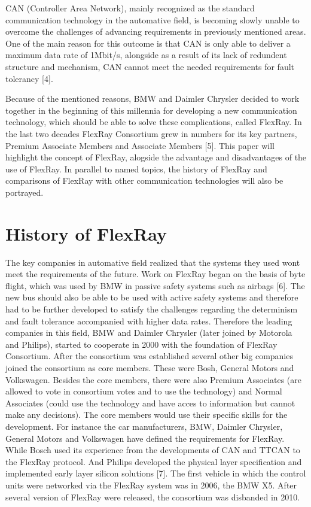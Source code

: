 \documentclass[conference]{IEEEtran}
\begin{document}
CAN (Controller Area Network), mainly recognized as the standard communication technology in the automative field, is becoming slowly unable to overcome the challenges of advancing requirements in previously mentioned areas. One of the main reason for this outcome is that CAN is only able to deliver a maximum data rate of 1Mbit/s, alongside as a result of its lack of redundent structure and mechanism, CAN cannot meet the needed requirements for fault tolerancy [4].

Because of the mentioned reasons, BMW and Daimler Chrysler decided to work together in the beginning of this millennia for developing a new communication technology, which should be able to solve these complications, called FlexRay. In the last two decades FlexRay Consortium grew in numbers for its key partners, Premium Associate Members and Associate Members [5]. This paper will highlight the concept of FlexRay, alogside the advantage and disadvantages of the use of FlexRay. In parallel to named topics, the history of FlexRay and comparisons of FlexRay with other communication technologies will also be portrayed.


\section{History of FlexRay}
The key companies in automative field realized that the systems they used wont meet the requirements of the future. Work on FlexRay began on the basis of byte flight, which was used by BMW in passive safety systems such as airbags [6]. The new bus should also be able to be used with active safety systems and therefore had to be further developed to satisfy the challenges regarding the determinism and fault tolerance accompanied with higher data rates. Therefore the leading companies in this field, BMW and Daimler Chrysler (later joined by Motorola and Philips), started to cooperate in 2000 with the foundation of FlexRay Consortium. After the consortium was established several other big companies joined the consortium as core members. These were Bosh, General Motors and Volkswagen. Besides the core members, there were also Premium Associates (are allowed to vote in consortium votes and to use the technology) and Normal Associates (could use the technology and have acces to information but cannot make any decisions). The core members would use their specific skills for the development. For instance the car manufacturers, BMW, Daimler Chrysler, General Motors and Volkswagen have defined the requirements for FlexRay. While Bosch used its experience from the developments of CAN and TTCAN to the FlexRay protocol. And Philips developed the physical layer specification and implemented early layer silicon solutions [7]. The first vehicle in which the control units were networked via the FlexRay system was in 2006, the BMW X5. After several version of FlexRay were released, the consortium was disbanded in 2010.
\end{document}
